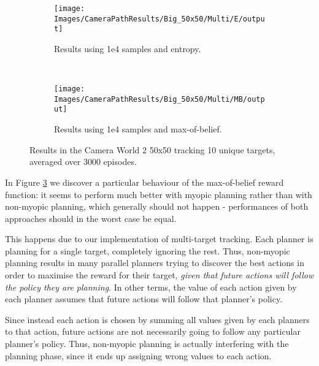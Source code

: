 \begin{figure}[ht]
        \centering
        \begin{subfigure}[t]{0.5\textwidth}
                \texttt{[image: Images/CameraPathResults/Big\_50x50/Multi/E/output]}
                \caption{Results using 1e4 samples and entropy.}
                \label{fig:cpb4e10}
        \end{subfigure}%
        ~ %
        \begin{subfigure}[t]{0.5\textwidth}
                \texttt{[image: Images/CameraPathResults/Big\_50x50/Multi/MB/output]}
                \caption{Results using 1e4 samples and max-of-belief.}
                \label{fig:cpb5mb10}
        \end{subfigure}
        \caption{Results in the Camera World 2 50x50 tracking 10 unique targets, averaged over 3000 episodes.}\label{fig:cpb10}
\end{figure}

In Figure \ref{fig:cpb10} we discover a particular behaviour of the max-of-belief reward function:
it seems to perform much better with myopic planning rather than with non-myopic planning, which
generally should not happen - performances of both approaches should in the worst case be equal.

This happens due to our implementation of multi-target tracking. Each planner is planning for a
single target, completely ignoring the rest. Thus, non-myopic planning results in many parallel
planners trying to discover the best actions in order to maximise the reward for their target,
\textit{given that future actions will follow the policy they are planning}. In other terms, the
value of each action given by each planner assumes that future actions will follow that planner's
policy.

Since instead each action is chosen by summing all values given by each planners to that action,
future actions are not necessarily going to follow any particular planner's policy. Thus, non-myopic
planning is actually interfering with the planning phase, since it ends up assigning wrong values to
each action.
